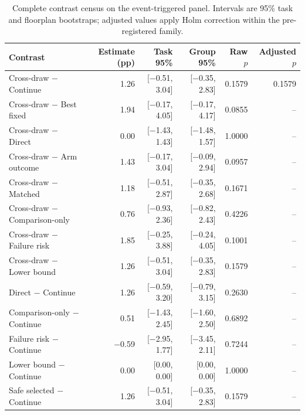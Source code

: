 \begin{table}[ht]
\caption{Complete contrast census on the event-triggered panel. Intervals are 95\% task and floorplan bootstraps; adjusted values apply Holm correction within the pre-registered family.}
\label{tab:r2-contrasts}
\centering
\small
\begin{tabular}{@{}lrrrrr@{}}
\toprule
Contrast & Estimate (pp) & Task 95\% & Group 95\% & Raw $p$ & Adjusted $p$ \\
\midrule
Cross-draw $-$ Continue & 1.26 & [$-$0.51, 3.04] & [$-$0.35, 2.83] & 0.1579 & 0.1579 \\
Cross-draw $-$ Best fixed & 1.94 & [$-$0.17, 4.05] & [$-$0.17, 4.17] & 0.0855 & -- \\
Cross-draw $-$ Direct & 0.00 & [$-$1.43, 1.43] & [$-$1.48, 1.57] & 1.0000 & -- \\
Cross-draw $-$ Arm outcome & 1.43 & [$-$0.17, 3.04] & [$-$0.09, 2.94] & 0.0957 & -- \\
Cross-draw $-$ Matched & 1.18 & [$-$0.51, 2.87] & [$-$0.35, 2.68] & 0.1671 & -- \\
Cross-draw $-$ Comparison-only & 0.76 & [$-$0.93, 2.36] & [$-$0.82, 2.43] & 0.4226 & -- \\
Cross-draw $-$ Failure risk & 1.85 & [$-$0.25, 3.88] & [$-$0.24, 4.05] & 0.1001 & -- \\
Cross-draw $-$ Lower bound & 1.26 & [$-$0.51, 3.04] & [$-$0.35, 2.83] & 0.1579 & -- \\
Direct $-$ Continue & 1.26 & [$-$0.59, 3.20] & [$-$0.79, 3.15] & 0.2630 & -- \\
Comparison-only $-$ Continue & 0.51 & [$-$1.43, 2.45] & [$-$1.60, 2.50] & 0.6892 & -- \\
Failure risk $-$ Continue & $-$0.59 & [$-$2.95, 1.77] & [$-$3.45, 2.11] & 0.7244 & -- \\
Lower bound $-$ Continue & 0.00 & [0.00, 0.00] & [0.00, 0.00] & 1.0000 & -- \\
Safe selected $-$ Continue & 1.26 & [$-$0.51, 3.04] & [$-$0.35, 2.83] & 0.1579 & -- \\
\bottomrule
\end{tabular}
\end{table}

